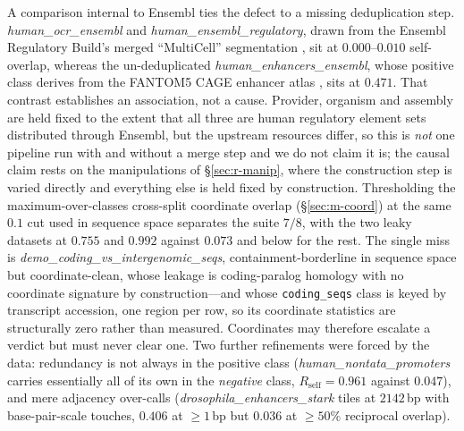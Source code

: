 \documentclass[webpdf,modern,large,namedate]{oup-authoring-template}%
\begin{document}
A comparison internal to Ensembl ties the defect to a missing deduplication step. \textit{human\_ocr\_ensembl} and \textit{human\_ensembl\_regulatory}, drawn from the Ensembl Regulatory Build's merged ``MultiCell'' segmentation \citep{zerbino2015regbuild}, sit at $0.000$--$0.010$ self-overlap, whereas the un-deduplicated \textit{human\_enhancers\_ensembl}, whose positive class derives from the FANTOM5 CAGE enhancer atlas \citep{andersson2014fantom5}, sits at $0.471$. That contrast establishes an association, not a cause. Provider, organism and assembly are held fixed to the extent that all three are human regulatory element sets distributed through Ensembl, but the upstream resources differ, so this is \emph{not} one pipeline run with and without a merge step and we do not claim it is; the causal claim rests on the manipulations of \S\ref{sec:r-manip}, where the construction step is varied directly and everything else is held fixed by construction. Thresholding the maximum-over-classes cross-split coordinate overlap (\S\ref{sec:m-coord}) at the same $0.1$ cut used in sequence space separates the suite $7/8$, with the two leaky datasets at $0.755$ and $0.992$ against $0.073$ and below for the rest. The single miss is \textit{demo\_coding\_vs\_intergenomic\_seqs}, containment-borderline in sequence space but coordinate-clean, whose leakage is coding-paralog homology with no coordinate signature by construction---and whose \texttt{coding\_seqs} class is keyed by transcript accession, one region per row, so its coordinate statistics are structurally zero rather than measured. Coordinates may therefore escalate a verdict but must never clear one. Two further refinements were forced by the data: redundancy is not always in the positive class (\textit{human\_nontata\_promoters} carries essentially all of its own in the \emph{negative} class, $R_{\mathrm{self}}=0.961$ against $0.047$), and mere adjacency over-calls (\textit{drosophila\_enhancers\_stark} tiles at $2142$\,bp with base-pair-scale touches, $0.406$ at ${\ge}1$\,bp but $0.036$ at $\ge50\%$ reciprocal overlap).
\end{document}
